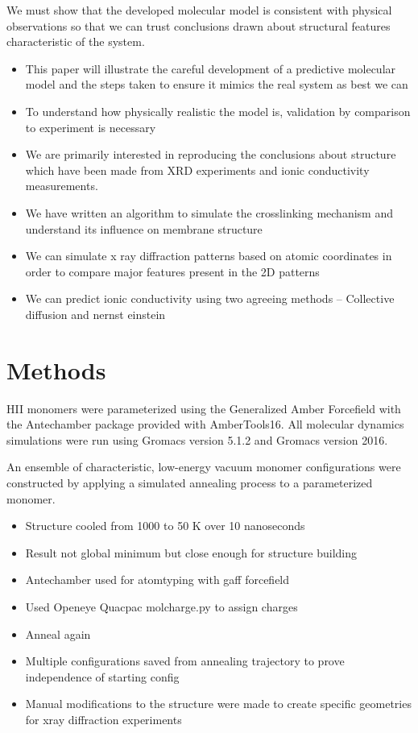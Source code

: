 \documentclass{article}
\begin{document}
	We must show that the developed molecular model is consistent with physical observations so that we can trust conclusions drawn about structural features characteristic of the system.
	\begin{itemize}
		\item This paper will illustrate the careful development of a predictive molecular model and the steps taken to ensure it mimics the real system as best we can 
		\item To understand how physically realistic the model is, validation by comparison to experiment is necessary
		\item We are primarily interested in reproducing the conclusions about structure which have been made from XRD experiments and ionic conductivity measurements.    
		\item We have written an algorithm to simulate the crosslinking mechanism and understand its influence on membrane structure
		\item We can simulate x ray diffraction patterns based on atomic coordinates in order to compare major features present in the 2D patterns
		\item We can predict ionic conductivity using two agreeing methods -- Collective diffusion and nernst einstein
	\end{itemize}
	
	\section{Methods}
	
	HII monomers were parameterized using the Generalized Amber Forcefield with the Antechamber package provided with AmberTools16. All molecular dynamics simulations were run using Gromacs version 5.1.2 and Gromacs version 2016.
	
	An ensemble of characteristic, low-energy vacuum monomer configurations were constructed by applying a simulated annealing process to a parameterized monomer.
	\begin{itemize}
		\item Structure cooled from 1000 to 50 K over 10 nanoseconds
		\item Result not global minimum but close enough for structure building
		\item Antechamber used for atomtyping with gaff forcefield
		\item Used Openeye Quacpac molcharge.py to assign charges %
		\item Anneal again 
		\item Multiple configurations saved from annealing trajectory to prove independence of starting config
		\item Manual modifications to the structure were made to create specific geometries for xray diffraction experiments
	\end{itemize}
	
\end{document}
